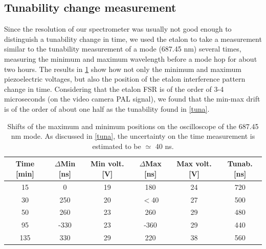 \subsection{Tunability change measurement}
Since the resolution of our spectrometer was usually not good enough to distinguish a tunability change in time, we used the etalon to take a measurement similar to the tunability measurement of a mode (687.45 nm) several times, measuring the minimum  and maximum wavelength before a mode hop for about two hours.
The results in \cref{minmaxshift} show how not only the minimum and maximum piezoelectric voltages, but also the position of the etalon interference pattern change in time. Considering that the etalon FSR is of the order of 3-4 microseconds (on the video camera PAL signal), we found that the min-max drift is of the order of about one half as the tunability found in \cref{tuna}.
\begin{table}[!p]
\begin{tabular}{|c|c|c|c|c|c|}
\hline
Time [min] & $\Delta$Min [ns] & Min volt. [V] & $\Delta$Max [ns] & Max volt. [V] & Tunab. [ns] \\ \hline
15 & 0 & 19 & 180 & 24 & 720 \\ \hline
30 & 250 & 20 & $<$40 & 27 & 500 \\ \hline
50 & 260 & 23 & 260 & 29 & 480 \\ \hline
95 & -330 & 23 & -360 & 29 & 440 \\ \hline
135 & 330 & 29 & 220 & 38 & 560 \\ \hline
\end{tabular}
\caption{Shifts of the maximum and minimum positions on the oscilloscope of the 687.45 nm mode. As discussed in \cref{tuna}, the uncertainty on the time measurement is estimated to be $\simeq$ 40 ns.}
\label{minmaxshift}
\end{table}